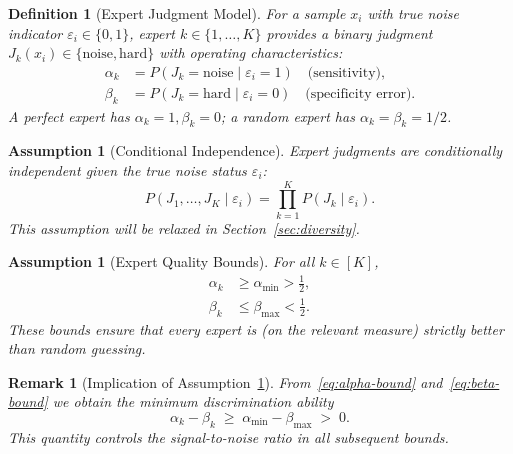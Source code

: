 \documentclass[12pt,a4paper]{article}
\newtheorem{definition}[theorem]{Definition}
\newtheorem{remark}[theorem]{Remark}
\newtheorem{assumption}[theorem]{Assumption}
\begin{document}
\begin{definition}[Expert Judgment Model]
\label{def:expert}
For a sample $x_i$ with true noise indicator $\varepsilon_i\in\{0,1\}$, expert
$k\in\{1,\dots,K\}$ provides a binary judgment
$J_k(x_i)\in\{\mathrm{noise},\mathrm{hard}\}$ with operating characteristics:
\begin{align}
    \alpha_k &= P(J_k=\mathrm{noise}\mid\varepsilon_i=1)
               \quad\text{(sensitivity)}, \label{eq:alpha}\\
    \beta_k  &= P(J_k=\mathrm{hard}\mid\varepsilon_i=0)
               \quad\text{(specificity error)}. \label{eq:beta}
\end{align}
A perfect expert has $\alpha_k=1,\beta_k=0$; a random expert has
$\alpha_k=\beta_k=1/2$.
\end{definition}

\begin{assumption}[Conditional Independence]
\label{ass:independence}
Expert judgments are conditionally independent given the true noise status
$\varepsilon_i$:
\begin{equation}\label{eq:cond-indep}
    P(J_1,\dots,J_K\mid\varepsilon_i) =
    \prod_{k=1}^K P(J_k\mid\varepsilon_i).
\end{equation}
This assumption will be relaxed in Section~\ref{sec:diversity}.
\end{assumption}

\begin{assumption}[Expert Quality Bounds]
\label{ass:quality}
For all $k\in[K]$,
\begin{align}
    \alpha_k &\geq \alpha_{\min} > \tfrac12, \label{eq:alpha-bound}\\
    \beta_k  &\leq \beta_{\max}  < \tfrac12. \label{eq:beta-bound}
\end{align}
These bounds ensure that every expert is (on the relevant measure) strictly
better than random guessing.
\end{assumption}

\begin{remark}[Implication of Assumption~\ref{ass:quality}]
\label{rem:gap}
From~\eqref{eq:alpha-bound} and~\eqref{eq:beta-bound} we obtain the minimum
discrimination ability
\begin{equation}\label{eq:min-gap}
    \alpha_k - \beta_k \;\geq\; \alpha_{\min} - \beta_{\max} \;>\; 0.
\end{equation}
This quantity controls the signal-to-noise ratio in all subsequent bounds.
\end{remark}
\end{document}
